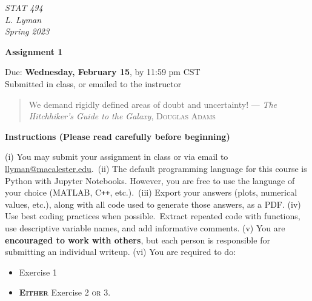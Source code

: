 \documentclass[11pt,letterpaper,twoside]{article}
\begin{document}
 \pagestyle{empty}
\begin{minipage}[t]{0.6\linewidth}
  {\small\it STAT 494\\
     L. Lyman \\
     Spring 2023}
\end{minipage}
\hfill

\smallskip

\begin{center}
\textbf{Assignment 1
{\color{blue}{-- Solution}}{}
}

\medskip
Due: \textbf{Wednesday, February 15}, by 11:59 pm CST\\
Submitted in class, or emailed to the instructor \\

\medskip


\end{center}
\medskip

\begin{quote}
We demand rigidly defined areas of doubt and uncertainty! --- \emph{The Hitchhiker’s Guide to the Galaxy}, \textsc{Douglas Adams}
\end{quote}

\bigskip

\textbf{Instructions (Please read carefully before beginning)}

\smallskip
(i) You may submit your assignment in class or via email to \href{mailto:llyman@macalester.edu}{llyman@macalester.edu}.~(ii) The default programming language for this course is Python with Jupyter Notebooks. However, you are free to use the language of your choice (MATLAB, C\texttt{++}, etc.).~(iii) Export your answers (plots, numerical values, etc.), along with all code used to generate those answers, as a PDF. (iv) Use best coding practices when possible.~Extract repeated code with functions, use descriptive variable names, and add informative comments. (v) You are \textbf{encouraged to work with others}, but each person is responsible for submitting an individual writeup. (vi) You are required to do:
\begin{itemize}

\item Exercise 1
\item \textbf{\textsc{Either}} Exercise 2 \textsc{or} 3.
\end{itemize}
\end{document}

